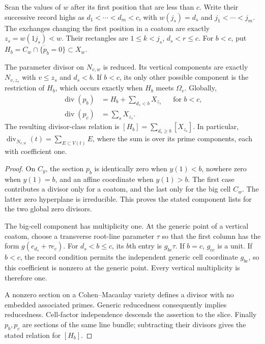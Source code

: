 Scan the values of $w$ after its first position that are less than $c$.
Write their successive record highs as $d_1<\cdots<d_m<c$, with
$w(j_s)=d_s$ and $j_1<\cdots<j_m$. The exchanges changing the first
position in a coatom are exactly
$z_s=w(1j_s)\lessdot w$.
Their rectangles are $1\leq k<j_s$, $d_s<r\leq c$.
For $b<c$, put $H_b=\overline{C_w\cap\{p_b=0\}}\subset X_w$.

\begin{lemma}\label{ta:fibre}
The parameter divisor on $N_{v,w}$ is reduced. Its vertical components
are exactly $N_{v,z_s}$ with $v\leq z_s$ and $d_s<b$. If $b<c$, its
only other possible component is the restriction of $H_b$, which occurs
exactly when $H_b$ meets $\Omega_v$. Globally,
\[
 \begin{aligned}
  \operatorname{div}(p_b)&=H_b+\sum_{d_s<b}X_{z_s}
     &&\text{for }b<c,\\
  \operatorname{div}(p_c)&=\sum_sX_{z_s}.
 \end{aligned}
\]
The resulting divisor-class relation is
$[H_b]=\sum_{d_s\geq b}[X_{z_s}]$.
In particular, $\operatorname{div}_{N_{v,w}}(t)=\sum_{E\subset V(t)}E$,
where the sum is over its prime components, each with coefficient one.
\end{lemma}

\begin{proof}
On $C_y$, the section $p_b$ is identically zero when $y(1)<b$, nowhere
zero when $y(1)=b$, and an affine coordinate when $y(1)>b$.
The first case contributes a divisor only for a coatom, and the last
only for the big cell $C_w$. The latter zero hyperplane is irreducible.
This proves the stated component lists for the two global zero divisors.

The big-cell component has multiplicity one. At the generic point of a
vertical coatom, choose a transverse root-line parameter $\tau$ so that
the first column has the form $g(e_{d_s}+\tau e_c)$. For $d_s<b\leq c$, its $b$th
entry is $g_{bc}\tau$. If $b=c$, $g_{cc}$ is a unit. If $b<c$, the
record condition permits the independent generic cell coordinate
$g_{bc}$, so this coefficient is nonzero at the generic point. Every
vertical multiplicity is therefore one.

A nonzero section on a Cohen--Macaulay variety defines a divisor with
no embedded associated primes. Generic reducedness consequently implies
reducedness. Cell-factor independence descends the assertion to the
slice. Finally $p_b,p_c$ are sections of the same line bundle; subtracting
their divisors gives the stated relation for $[H_b]$.
\end{proof}

